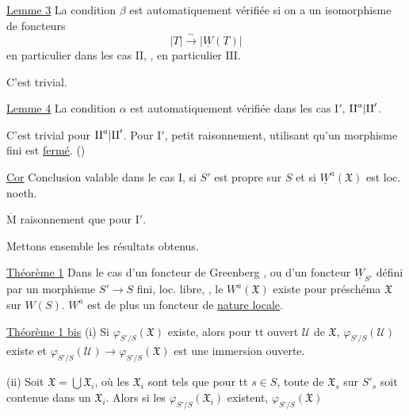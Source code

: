 \uline{Lemme 3} La condition $\beta$ est automatiquement vérifiée
si on a un isomorphisme de foncteurs
\[
|T|\xrightarrow{\sim}|\underline W(T)|
\]
en particulier dans les cas $\mathrm{II}$, ,
en particulier $\mathrm{III}$.

C'est trivial.

\uline{Lemme 4} La condition $\alpha$ est automatiquement
vérifiée dans les cas $\mathrm{I}'$, $\mathrm{II}^{a}|\mathrm{II}'$.

C'est trivial pour $\mathrm{II}^{a}|\mathrm{II}'$.
Pour $\mathrm{I}'$, petit raisonnement, utilisant qu'un morphisme
fini est \uline{fermé}. ()

\uline{Cor} Conclusion valable dans le cas $\mathrm I$, si
$S'$ est propre sur $S$ et si $\underline W^a(\mathfrak X)$ est loc. noeth.

$\overline{\mathrm M}$ raisonnement que pour $\mathrm I'$.

Mettons ensemble les résultats obtenus.

\uline{Théorème 1} Dans le cas d'un foncteur de Greenberg
, ou d'un foncteur $\underline W_{S'}$ défini
par un morphisme $S'\to S$ fini, loc. libre,
 , le $W^a(\mathfrak X)$ existe pour
 préschéma $\mathfrak X$ sur $W(S)$.
$W^a$ est de plus un foncteur de \uline{nature locale}.

\uline{Théorème 1 bis}
(i) Si $\varphi_{S'/S}(\mathfrak X)$ existe, alors
pour tt ouvert $\mathcal U$ de $\mathfrak X$,
$\varphi_{S'/S}(\mathcal U)$ existe
et $\varphi_{S'/S}(\mathcal U)\to\varphi_{S'/S}(\mathfrak X)$ est une
immersion ouverte.

(ii) Soit $\mathfrak X=\bigcup\mathfrak X_i$, où les $\mathfrak X_i$ sont
tels que pour tt $s\in S$, toute 
 de $\mathfrak X_s$ sur $S'_s$ soit contenue dans un $\mathfrak X_i$.
Alors si les $\varphi_{S'/S}(\mathfrak X_i)$ existent, $\varphi_{S'/S}(\mathfrak X)$

